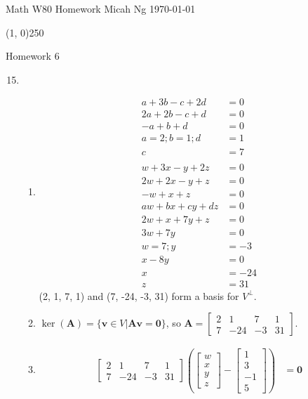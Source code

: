 \documentclass[11pt,letterpaper]{article}
\begin{document}
\noindent
Math W80 Homework \hfill Micah Ng \hfill \today

\begin{center}
\line(1, 0){250}
\end{center}

\noindent
Homework 6

\begin{enumerate}
\setcounter{enumi}{14}
\item
  \begin{enumerate}
  \item
    \begin{align*}
      a+3b-c+2d &= 0 \tag{1} \\
      2a+2b-c+d &= 0 \tag{2} \\
      -a+b+d &= 0 \tag{$1-2$} \\
      a = 2; b = 1; d &= 1 \tag{arbitrary choice} \\
      c &= 7 \\
      \\
      w+3x-y+2z &= 0 \tag{3} \\
      2w+2x-y+z &= 0 \tag{4} \\
      -w+x+z &= 0 \tag{5: $3-4$} \\
      aw+bx+cy+dz &= 0 \\
      2w+x+7y+z &= 0 \tag{6} \\
      3w+7y &= 0 \tag{$6-5$} \\
      w = 7; y &= -3 \tag{arbitrary choice} \\
      x-8y &= 0 \tag{$4-6$} \\
      x &= -24 \\
      z &= 31
    \end{align*}
    (2, 1, 7, 1) and (7, -24, -3, 31) form a basis for $V^\perp$.

  \item
    $\ker(\mathbf{A})=\{\mathbf{v}\in V|\mathbf{Av}=\mathbf{0}\}$, so
    $\mathbf{A}=\begin{bmatrix}
      2 & 1 & 7 & 1 \\
      7 & -24 & -3 & 31
    \end{bmatrix}$.

  \item
    \begin{align*}
      \begin{bmatrix}
        2 & 1 & 7 & 1 \\
        7 & -24 & -3 & 31
      \end{bmatrix}
      \left(
      \begin{bmatrix}
        w \\ x \\ y \\ z
      \end{bmatrix}
      -
      \begin{bmatrix}
        1 \\ 3 \\ -1 \\ 5
      \end{bmatrix}
      \right)
      &= \mathbf{0}
    \end{align*}
  \end{enumerate}

\end{enumerate}
\end{document}

